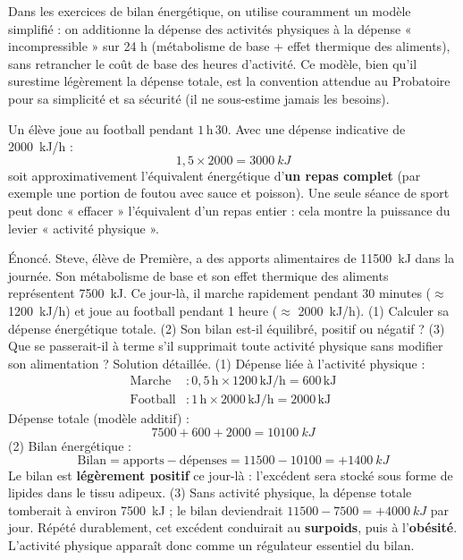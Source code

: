 \documentclass[11pt]{article}
\begin{document}
\begin{attention}
Dans les exercices de bilan énergétique, on utilise couramment un modèle simplifié : on additionne la dépense des activités physiques à la dépense « incompressible » sur 24 h (métabolisme de base + effet thermique des aliments), sans retrancher le coût de base des heures d'activité. Ce modèle, bien qu'il surestime légèrement la dépense totale, est la convention attendue au Probatoire pour sa simplicité et sa sécurité (il ne sous-estime jamais les besoins).
\end{attention}

\begin{exemplebox}
Un élève joue au football pendant $1\,\text{h}\,30$. Avec une dépense indicative de \SI{2000}{kJ/h} :
\[ 1{,}5 \times 2000 = \SI{3000}{kJ} \]
soit approximativement l'équivalent énergétique d'\textbf{un repas complet} (par exemple une portion de foutou avec sauce et poisson). Une seule séance de sport peut donc « effacer » l'équivalent d'un repas entier : cela montre la puissance du levier « activité physique ».
\end{exemplebox}

\begin{exoresolu}
Énoncé. Steve, élève de Première, a des apports alimentaires de \SI{11500}{kJ} dans la journée. Son métabolisme de base et son effet thermique des aliments représentent \SI{7500}{kJ}. Ce jour-là, il marche rapidement pendant 30 minutes ($\approx$ \SI{1200}{kJ/h}) et joue au football pendant 1 heure ($\approx$ \SI{2000}{kJ/h}). (1) Calculer sa dépense énergétique totale. (2) Son bilan est-il équilibré, positif ou négatif ? (3) Que se passerait-il à terme s'il supprimait toute activité physique sans modifier son alimentation ?
\tcblower
Solution détaillée.
(1) Dépense liée à l'activité physique :
\begin{align*}
\text{Marche} &: 0{,}5\,\text{h} \times 1200\,\text{kJ/h} = 600\,\text{kJ} \\
\text{Football} &: 1\,\text{h} \times 2000\,\text{kJ/h} = 2000\,\text{kJ}
\end{align*}
Dépense totale (modèle additif) :
\[ 7500 + 600 + 2000 = \SI{10100}{kJ} \]
(2) Bilan énergétique :
\[ \text{Bilan} = \text{apports} - \text{dépenses} = 11500 - 10100 = +\SI{1400}{kJ} \]
Le bilan est \textbf{légèrement positif} ce jour-là : l'excédent sera stocké sous forme de lipides dans le tissu adipeux.
(3) Sans activité physique, la dépense totale tomberait à environ \SI{7500}{kJ} ; le bilan deviendrait $11500 - 7500 = +\SI{4000}{kJ}$ par jour. Répété durablement, cet excédent conduirait au \textbf{surpoids}, puis à l'\textbf{obésité}. L'activité physique apparaît donc comme un régulateur essentiel du bilan.
\end{exoresolu}
\end{document}
